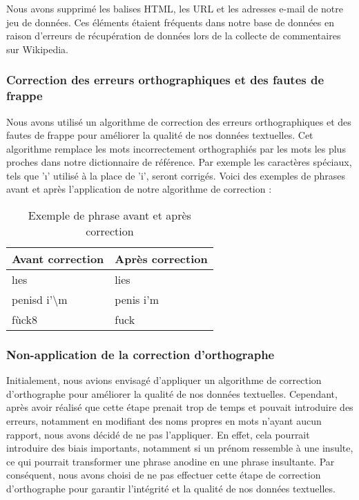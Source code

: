 Nous avons supprimé les balises HTML, les URL et les adresses e-mail de notre jeu de données. Ces éléments étaient fréquents dans notre base de données en raison d'erreurs de récupération de données lors de la collecte de commentaires sur Wikipedia.

\subsubsection*{Correction des erreurs orthographiques et des fautes de frappe}

Nous avons utilisé un algorithme de correction des erreurs orthographiques et des fautes de frappe pour améliorer la qualité de nos données textuelles. Cet algorithme remplace les mots incorrectement orthographiés par les mots les plus proches dans notre dictionnaire de référence. Par exemple les caractères spéciaux, tels que 'ı' utilisé à la place de 'i', seront corrigés. Voici des exemples de phrases avant et après l'application de notre algorithme de correction :

\begin{table}[h]
    \centering
    \begin{tabular}{|l|l|}
    \hline
    \textbf{Avant correction} & \textbf{Après correction} \\ \hline
    lıes  & lies \\ \hline
    penisd i'\textbackslash m & penis i'm  \\ \hline
    fùck8 & fuck  \\ \hline
    \end{tabular}
    \caption{Exemple de phrase avant et après correction}
\end{table}

\subsubsection*{Non-application de la correction d'orthographe}
Initialement, nous avions envisagé d'appliquer un algorithme de correction d'orthographe pour améliorer la qualité de nos données textuelles. Cependant, après avoir réalisé que cette étape prenait trop de temps et pouvait introduire des erreurs, notamment en modifiant des noms propres en mots n'ayant aucun rapport, nous avons décidé de ne pas l'appliquer. En effet, cela pourrait introduire des biais importants, notamment si un prénom ressemble à une insulte, ce qui pourrait transformer une phrase anodine en une phrase insultante. Par conséquent, nous avons choisi de ne pas effectuer cette étape de correction d'orthographe pour garantir l'intégrité et la qualité de nos données textuelles.


